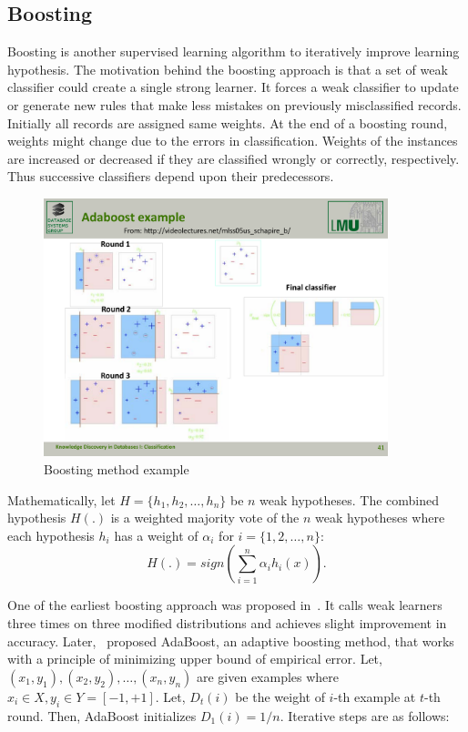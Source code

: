 \documentclass[a4paper, 11pt, oneside]{book}
\begin{document}
\subsection{Boosting}
Boosting is another supervised learning algorithm to iteratively improve learning hypothesis. The motivation behind the boosting approach is that a set of weak classifier could create a single strong learner. It forces a weak classifier to update or generate new rules that make less mistakes on previously misclassified records. Initially all records are assigned same weights. At the end of a boosting round, weights might change due to the errors in classification. Weights of the instances are increased or decreased if they are classified wrongly or correctly, respectively. Thus successive classifiers depend upon their predecessors. 
\begin{figure}[htbp]
    \begin{center}
        \includegraphics[width=10.0cm]{figs/boosting.pdf}
        \caption{Boosting method example}
        \label{fig:bg:bagging}
    \end{center}
\end{figure}

Mathematically, let $H= \{h_1, h_2, \dots, h_n\}$ be $n$ weak hypotheses. The combined hypothesis $H(.)$ is a weighted majority vote of the $n$ weak hypotheses where each hypothesis $h_i$ has a weight of $\alpha_i$ for $i = \{1, 2, \dots, n\}$:
\begin{equation}
\label{eqn:adaboostHypo}
    H(.) = sign \left(\sum_{i=1}^n \alpha_i h_i(x) \right).
\end{equation}

One of the earliest boosting approach was proposed in~\cite{schapire90:whyens}. It calls weak learners three times on three modified distributions and achieves slight improvement in accuracy. Later,~\cite{freund97:boosting} proposed AdaBoost, an adaptive boosting method, that works with a principle of minimizing upper bound of empirical error. Let, $(x_1, y_1), (x_2, y_2), \dots, (x_n, y_n)$ are given examples where $x_i \in X, y_i \in Y = [-1, +1]$. Let, $D_t (i)$ be the weight of $i$-th example at $t$-th round. Then, AdaBoost initializes $D_1(i) =1/n$. Iterative steps are as follows:
\end{document}
